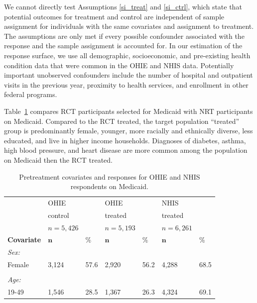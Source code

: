 \documentclass[hidelinks,12pt]{article}
\begin{document}
{We cannot directly test Assumptions \ref{si_treat} and \ref{si_ctrl}, which state that potential outcomes for treatment and control are independent of sample assignment for individuals with the same covariates and assignment to treatment. The assumptions are only met if every possible confounder associated with the response and the sample assignment is accounted for. In our estimation of the response surface, we use all demographic, socioeconomic, and pre-existing health condition data that were common in the OHIE and NHIS data. Potentially important unobserved confounders include the number of hospital and outpatient visits in the previous year, proximity to health services, and enrollment in other federal programs. 

Table~\ref{rct-nrt-compare} compares RCT participants selected for Medicaid with NRT participants on Medicaid. Compared to the RCT treated, the target population ``treated''  group is predominantly female, younger, more racially and ethnically diverse, less educated, and live in higher income households. Diagnoses of diabetes, asthma, high blood pressure, and heart disease are more common among the population on Medicaid then the RCT treated.

\begin{singlespace}
\begin{longtable}{lllllll}
\caption{Pretreatment covariates and responses for OHIE and NHIS respondents on Medicaid.\label{rct-nrt-compare}} \\
  & OHIE &  & OHIE &  & NHIS &  \\ 
    & control &  & treated &  &treated &   \\ 
  & $n=5,426$ &  & $n=5,193$ &  & $n=6,261$ &  \\  
  \hline   
    \hline   
 \textbf{Covariate} &  $\mathbf{n}$ & $\mathbf{\%}$ & $\mathbf{n}$ & $\mathbf{\%}$ & $\mathbf{n}$ & $\mathbf{\%}$ \\ 
\hline
\textit{Sex:} &  & & &  &  & \\ 

\hspace{3mm} Female & 3,124 & 57.6 & 2,920 & 56.2 & 4,288 & 68.5 \\ 
 &  & & &  &  & \\ 
\textit{Age:} &  & & &  &  & \\ 
\hspace{3mm}19-49 & 1,546 & 28.5 & 1,367 & 26.3 & 4,324 & 69.1  \\ 


\end{longtable}
\end{singlespace}}
\end{document}

